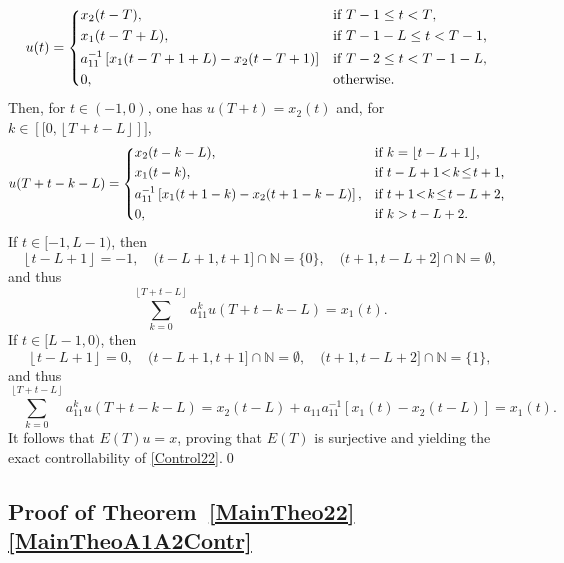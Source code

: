 \documentclass[10pt]{amsart}
\newcommand{\llbracket}{[\![}
\newcommand{\rrbracket}{]\!]}
\theoremstyle{plain}
\theoremstyle{definition}
\newcommand{\floor}[1]{\left\lfloor #1 \right\rfloor}
\begin{document}
\[
u(t) =
\begin{dcases*}
x_2(t - T), & if $T - 1 \leq t < T$, \\
x_1(t - T + L), & if $T - 1 - L \leq t < T - 1$, \\
a_{11}^{-1} \left[x_1(t - T + 1 + L) - x_2(t - T + 1)\right] & if $T - 2 \leq t < T - 1 - L$, \\
0, & otherwise.
\end{dcases*}
\]
Then, for $t \in (-1, 0)$, one has $u(T + t) = x_2(t)$ and, for $k \in \left\llbracket 0, \floor{T + t - L}\right\rrbracket$,
\[
u(T + t - k - L) =
\begin{dcases*}
x_2(t - k - L), & if $k = \floor{t - L + 1}$, \\
x_1(t - k), & if $t - L + 1 \!<\! k \!\leq\! t + 1$, \\
a_{11}^{-1} \left[x_1(t + 1 - k) - x_2(t + 1 - k - L)\right], & if $t + 1 \!<\! k \!\leq\! t - L + 2$, \\
0, & if $k > t - L + 2$.
\end{dcases*}
\]
If $t \in [-1, L - 1)$, then
\[
\floor{t - L + 1} = -1,\quad (t - L + 1, t + 1] \cap \mathbb N = \{0\},\quad (t + 1, t - L + 2] \cap \mathbb N = \emptyset,
\]
and thus
\[
\sum_{k=0}^{\floor{T + t - L}} a_{11}^k u(T + t - k - L) = x_1(t).
\]
If $t \in [L - 1, 0)$, then
\[
\floor{t - L + 1} = 0,\quad (t - L + 1, t + 1] \cap \mathbb N = \emptyset,\quad (t + 1, t - L + 2] \cap \mathbb N = \{1\},
\]
and thus
\[
\sum_{k=0}^{\floor{T + t - L}} a_{11}^k u(T + t - k - L) = x_2(t - L) + a_{11} a_{11}^{-1} \left[x_1(t) - x_2(t - L)\right] = x_1(t).
\]
It follows that $E(T) u = x$, proving that $E(T)$ is surjective and yielding the exact controllability of \eqref{Control22}.\qed

\subsection{Proof of Theorem~\ref{MainTheo22}\eqref{MainTheoA1A2Contr}}
\label{SecProofCaseC}
\end{document}

